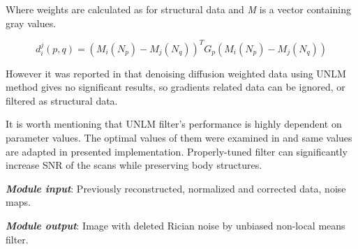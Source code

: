 Where weights are calculated as for structural data and \textit{M}
is a vector containing gray values.

\begin{equation}
d_{i}^{j}(p,q)=(M_{i}(N_{p})-M_{j}(N_{q}))^{T}G_{p}(M_{i}(N_{p})-M_{j}(N_{q}))\label{m5e7}
\end{equation}

However it was reported in \cite{5a2} that denoising diffusion weighted data using
UNLM method gives no significant results, so gradients related data can be ignored, or 
filtered as structural data.

It is worth mentioning that UNLM filter's performance is highly dependent
on parameter values. The optimal values of them were examined in \cite{5a1}
and same values are adapted in presented implementation. Properly-tuned
filter can significantly increase SNR of the scans while preserving
body structures.

\textbf{\emph{Module input}}: Previously reconstructed, normalized
and corrected data, noise maps.

\textbf{\emph{Module output}}: Image with deleted Rician noise by
unbiased non-local means filter. \\